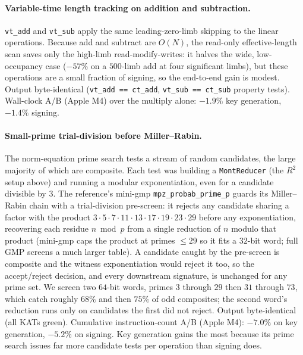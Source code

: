 \paragraph{Variable-time length tracking on addition and subtraction.}
\texttt{vt\_add} and \texttt{vt\_sub} apply the same leading-zero-limb
skipping to the linear operations.  Because add and subtract are $O(N)$,
the read-only effective-length scan saves only the high-limb
read-modify-writes: it halves the wide, low-occupancy case ($-57\%$ on a
$500$-limb add at four significant limbs), but these operations are a
small fraction of signing, so the end-to-end gain is modest.  Output
byte-identical (\texttt{vt\_add == ct\_add}, \texttt{vt\_sub == ct\_sub}
property tests).  Wall-clock A/B (Apple M4) over the multiply alone:
$-1.9\%$ key generation, $-1.4\%$ signing.

\paragraph{Small-prime trial-division before Miller--Rabin.}
The norm-equation prime search tests a stream of random candidates, the
large majority of which are composite.  Each test was building a
\texttt{MontReducer} (the $R^2$ setup above) and running a modular
exponentiation, even for a candidate divisible by $3$.  The reference's
mini-gmp \texttt{mpz\_probab\_prime\_p} guards its Miller--Rabin chain
with a trial-division pre-screen: it rejects any candidate sharing a
factor with the product $3 \cdot 5 \cdot 7 \cdot 11 \cdot 13 \cdot 17
\cdot 19 \cdot 23 \cdot 29$ before any exponentiation, recovering each
residue $n \bmod p$ from a single reduction of $n$ modulo that product
(mini-gmp caps the product at primes $\le 29$ so it fits a $32$-bit
word; full GMP screens a much larger table).  A candidate caught by the
pre-screen is composite and the witness exponentiation would reject it
too, so the accept/reject decision, and every downstream signature, is
unchanged for any prime set.  We screen two $64$-bit words, primes $3$
through $29$ then $31$ through $73$, which catch roughly $68\%$ and then
$75\%$ of odd composites; the second word's reduction runs only on
candidates the first did not reject.  Output byte-identical (all KATs
green).  Cumulative instruction-count A/B (Apple M4): $-7.0\%$ on key
generation, $-5.2\%$ on signing.  Key generation gains the most because
its prime search issues far more candidate tests per operation than
signing does.

